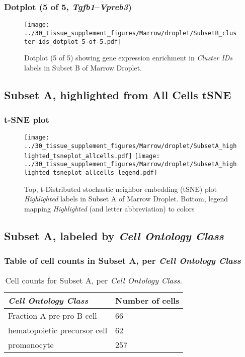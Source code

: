 \clearpage

\subsubsection{Dotplot (5 of 5, \emph{Tgfb1}--\emph{Vpreb3})}
\begin{figure}[h]
\centering
\texttt{[image: ../30\_tissue\_supplement\_figures/Marrow/droplet/SubsetB\_cluster-ids\_dotplot\_5-of-5.pdf]}

\caption{ Dotplot (5 of 5)  showing gene expression enrichment in \emph{Cluster IDs} labels in Subset B of Marrow Droplet. }
\end{figure}


\clearpage
\subsection{Subset A, highlighted from All Cells tSNE}
\subsubsection{t-SNE plot}
\begin{figure}[h]
\centering
\texttt{[image: ../30\_tissue\_supplement\_figures/Marrow/droplet/SubsetA\_highlighted\_tsneplot\_allcells.pdf]}
\texttt{[image: ../30\_tissue\_supplement\_figures/Marrow/droplet/SubsetA\_highlighted\_tsneplot\_allcells\_legend.pdf]}
\caption{Top, t-Distributed stochastic neighbor embedding (tSNE) plot  \emph{Highlighted} labels in Subset A of Marrow Droplet. Bottom, legend mapping \emph{Highlighted} (and letter abbreviation) to colors}
\end{figure}


\clearpage

\subsection{Subset A, labeled by \emph{Cell Ontology Class}}
\subsubsection{Table of cell counts in Subset A, per \emph{Cell Ontology Class}}\begin{table}[h]
\centering
\label{my-label}
\begin{tabular}{@{}ll@{}}
\toprule

\emph{Cell Ontology Class}& Number of cells \\ \midrule
Fraction A pre-pro B cell & 66 \\

hematopoietic precursor cell & 62 \\

promonocyte & 257 \\
\bottomrule
\end{tabular}
\caption{Cell counts for Subset A, per \emph{Cell Ontology Class}.}
\end{table}

